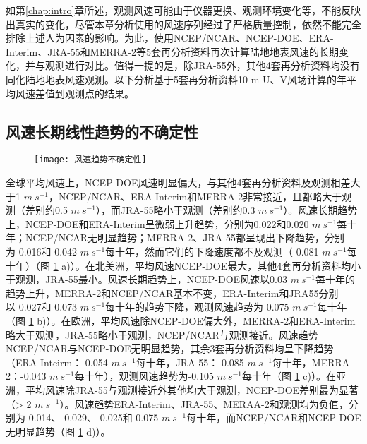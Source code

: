 如第\ref{chap:intro}章所述，观测风速可能由于仪器更换、观测环境变化等，不能反映出真实的变化，尽管本章分析使用的风速序列经过了严格质量控制，依然不能完全排除上述人为因素的影响。为此，使用NCEP/NCAR、NCEP-DOE、ERA-Interim、JRA-55和MERRA-2等5套再分析资料再次计算陆地地表风速的长期变化，并与观测进行对比。值得一提的是，除JRA-55外，其他4套再分析资料均没有同化陆地地表风速观测。以下分析基于5套再分析资料10 m U、V风场计算的年平均风速差值到观测点的结果。

\subsection{风速长期线性趋势的不确定性}

\begin{figure}[!t]
    \centering
    \texttt{[image: 风速趋势不确定性]}
    \label{fig:uncertaintywindtrend}
\end{figure}

全球平均风速上，NCEP-DOE风速明显偏大，与其他4套再分析资料及观测相差大于1 $m ~ s^{-1}$，NCEP/NCAR、ERA-Interim和MERRA-2非常接近，且都略大于观测（差别约0.5 $m ~ s^{-1}$），而JRA-55略小于观测（差别约0.3 $m ~ s^{-1}$）。风速长期趋势上，NCEP-DOE和ERA-Interim呈微弱上升趋势，分别为0.022和0.020 $m ~ s^{-1}$每十年；NCEP/NCAR无明显趋势；MERRA-2、JRA-55都呈现出下降趋势，分别为-0.016和-0.042 $m ~ s^{-1}$每十年，然而它们的下降速度都不及观测（-0.081 $m ~ s^{-1}$每十年）（图 \ref{fig:uncertaintywindtrend} a)）。在北美洲，平均风速NCEP-DOE最大，其他4套再分析资料均小于观测，JRA-55最小。风速长期趋势上，NCEP-DOE风速以0.03 $m ~ s^{-1}$每十年的趋势上升，MERRA-2和NCEP/NCAR基本不变，ERA-Interim和JRA55分别以-0.027和-0.073 $m ~ s^{-1}$每十年的趋势下降，观测风速趋势为-0.075 $m ~ s^{-1}$每十年（图 \ref{fig:uncertaintywindtrend} b)）。在欧洲，平均风速除NCEP-DOE偏大外，MERRA-2和ERA-Interim略大于观测，JRA-55略小于观测，NCEP/NCAR与观测接近。风速趋势NCEP/NCAR与NCEP-DOE无明显趋势，其余3套再分析资料均呈下降趋势（ERA-Inteirm：-0.054 $m ~ s^{-1}$每十年，JRA-55：-0.085 $m ~ s^{-1}$每十年，MERRA-2：-0.043 $m ~ s^{-1}$每十年），观测风速趋势为-0.105 $m ~ s^{-1}$每十年（图 \ref{fig:uncertaintywindtrend} c)）。在亚洲，平均风速除JRA-55与观测接近外其他均大于观测，NCEP-DOE差别最为显著（> 2 $m ~ s^{-1}$）。风速趋势ERA-Interim、JRA-55、MERAA-2和观测均为负值，分别为-0.014、-0.029、-0.025和-0.075 $m ~ s^{-1}$每十年，而NCEP/NCAR和NCEP-DOE无明显趋势（图 \ref{fig:uncertaintywindtrend} d)）。


